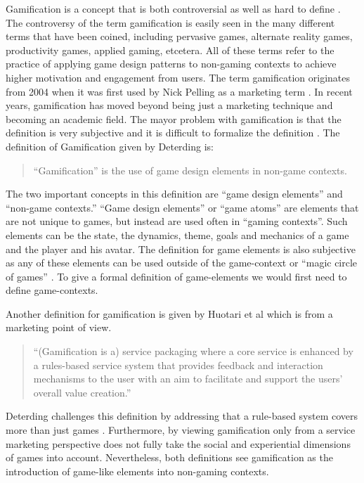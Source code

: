 \documentclass[11pt]{article}
\begin{document}
Gamification is a concept that is both controversial \cite{McGonigal2011} as well as hard to define \cite{Deterding2011}. The controversy of the term gamification is easily seen in the many different terms that have been coined, including pervasive games, alternate reality games, productivity games, applied gaming, etcetera. All of these terms refer to the practice of applying game design patterns to non-gaming contexts to achieve higher motivation and engagement from users. The term gamification originates from 2004 when it was first used by Nick Pelling as a marketing term \cite{Huotari2012}. In recent years, gamification has moved beyond being just a marketing technique and becoming an academic field. The mayor problem with gamification is that the definition is very subjective and it is difficult to formalize the definition \cite{Huotari2012, Deterding2011}. 
%
The definition of Gamification given by Deterding \cite{Deterding2011} is:
\begin{quote}
	``Gamification'' is the use of game design elements in non-game contexts. 
\end{quote}

The two important concepts in this definition are ``game design elements'' and ``non-game contexts.'' ``Game design elements'' or ``game atoms'' \cite{Deterding2011, Brathwaite2008} are elements that are not unique to games, but instead are used often in ``gaming contexts''. Such elements can be the state, the dynamics, theme, goals and mechanics of a game and the player and his avatar. The definition for game elements is also subjective as any of these elements can be used outside of the game-context or ``magic circle of games'' \cite{Huizinga}. To give a formal definition of game-elements we would first need to define game-contexts.

Another definition for gamification is given by Huotari et al \cite{Huotari2012} which is from a marketing point of view.
\begin{quote}
	“(Gamification is a) service packaging where a core service is
enhanced by a rules-based service system that provides feedback
and interaction mechanisms to the user with an aim to facilitate
and support the users’ overall value creation.”
\end{quote}

Deterding challenges this definition by addressing that a rule-based system covers more than just games \cite{Deterding2011}. Furthermore, by viewing gamification only from a service marketing perspective does not fully take the social and experiential dimensions of games into account. Nevertheless, both definitions see gamification as the introduction of game-like elements into non-gaming contexts.
\end{document}
